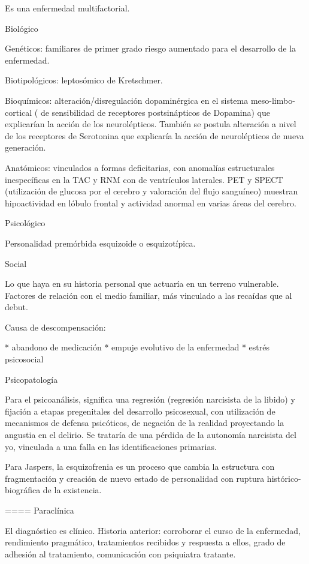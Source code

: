 Es una enfermedad multifactorial.

Biológico

Genéticos: familiares de primer grado riesgo aumentado para el desarrollo de la enfermedad.

Biotipológicos: leptosómico de Kretschmer.

Bioquímicos: alteración/disregulación dopaminérgica en el sistema meso-limbo-cortical ( de sensibilidad de receptores postsinápticos de Dopamina) que explicarían la acción de los neurolépticos. También se postula alteración a nivel de los receptores de Serotonina que explicaría la acción de neurolépticos de nueva generación.

Anatómicos: vinculados a formas deficitarias, con anomalías estructurales inespecíficas en la TAC y RNM con de ventrículos laterales. PET y SPECT (utilización de glucosa por el cerebro y valoración del flujo sanguíneo) muestran hipoactividad en lóbulo frontal y actividad anormal en varias áreas del cerebro.

Psicológico

Personalidad premórbida esquizoide o esquizotípica.

Social

Lo que haya en su historia personal que actuaría en un terreno vulnerable. Factores de relación con el medio familiar, más vinculado a las recaídas que al debut.

Causa de descompensación:

* abandono de medicación
* empuje evolutivo de la enfermedad
* estrés psicosocial

Psicopatología

Para el psicoanálisis, significa una regresión (regresión narcisista de la libido) y fijación a etapas pregenitales del desarrollo psicosexual, con utilización de mecanismos de defensa psicóticos, de negación de la realidad proyectando la angustia en el delirio. Se trataría de una pérdida de la autonomía narcisista del yo, vinculada a una falla en las identificaciones primarias.

Para Jaspers, la esquizofrenia es un proceso que cambia la estructura con fragmentación y creación de nuevo estado de personalidad con ruptura histórico-biográfica de la existencia.

==== Paraclínica

El diagnóstico es clínico. Historia anterior: corroborar el curso de la enfermedad, rendimiento pragmático, tratamientos recibidos y respuesta a ellos, grado de adhesión al tratamiento, comunicación con psiquiatra tratante.

